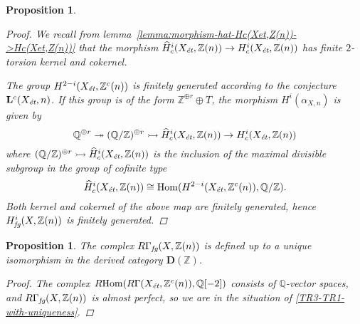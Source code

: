 \documentclass[draft,leqno,12pt]{article}
\theoremstyle{plain}
\newtheorem{proposition}[theorem]{\indent\sc Proposition}
\theoremstyle{definition}
\DeclareMathOperator{\Hom}{Hom}
\newcommand{\ZZ}{\mathbb{Z}}
\newcommand{\QQ}{\mathbb{Q}}
\newcommand{\et}{\text{\it \'{e}t}}
\newcommand{\fg}{\text{\it fg}}
\newcommand{\RHom}{R\!\Hom}
\begin{document}
\begin{proposition}
\begin{proof}
    We recall from lemma~\ref{lemma:morphism-hat-Hc(Xet,Z(n))->Hc(Xet,Z(n))}
    that the morphism
    $\widehat{H}^i_c (X_\et, \ZZ (n)) \to H^i_c (X_\et, \ZZ (n))$ has finite
    $2$-torsion kernel and cokernel.

    The group $H^{2-i} (X_\et, \ZZ^c (n))$ is finitely generated
    according to the conjecture $\mathbf{L}^c (X_\et, n)$. If this
    group is of the form $\ZZ^{\oplus r}\oplus T$, the morphism
    $H^i (\alpha_{X,n})$ is given by
    \[ \QQ^{\oplus r} \twoheadrightarrow
      (\QQ/\ZZ)^{\oplus r} \rightarrowtail
      \widehat{H}^i_c (X_\et, \ZZ (n)) \to
      H^i_c (X_\et, \ZZ (n)) \]
    where
    $(\QQ/\ZZ)^{\oplus r} \rightarrowtail \widehat{H}^i_c (X_\et, \ZZ (n))$ is
    the inclusion of the maximal divisible subgroup in the group of cofinite
    type
    $$\widehat{H}^i_c (X_\et, \ZZ (n)) \cong \Hom (H^{2-i} (X_\et, \ZZ^c (n)), \QQ/\ZZ).$$
    Both kernel and cokernel of the above map are finitely generated, hence
    $H^i_\fg (X, \ZZ (n))$ is finitely generated.
  \end{proof}
\end{proposition}

\begin{proposition}
  \label{prop:RGamma-fg-uniquely-defined}
  The complex $R\Gamma_\fg (X, \ZZ (n))$ is defined up to a unique isomorphism
  in the derived category $\mathbf{D} (\ZZ)$.

  \begin{proof}
    The complex $\RHom (R\Gamma (X_\et, \ZZ^c (n)), \QQ [-2])$ consists of
    $\QQ$-vector spaces, and $R\Gamma_\fg (X, \ZZ (n))$ is almost perfect, so we
    are in the situation of \ref{TR3-TR1-with-uniqueness}.
  \end{proof}
\end{proposition}
\end{document}
